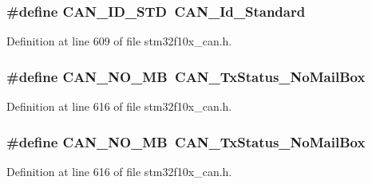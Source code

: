 \subsubsection[{\texorpdfstring{C\+A\+N\+\_\+\+I\+D\+\_\+\+S\+TD}{CAN_ID_STD}}]{\setlength{\rightskip}{0pt plus 5cm}\#define C\+A\+N\+\_\+\+I\+D\+\_\+\+S\+TD~{\bf C\+A\+N\+\_\+\+Id\+\_\+\+Standard}}\hypertarget{group___c_a_n___legacy_ga284ca16658deb9d0c21f4ddc6db14833}{}\label{group___c_a_n___legacy_ga284ca16658deb9d0c21f4ddc6db14833}


Definition at line 609 of file stm32f10x\+\_\+can.\+h.

\subsubsection[{\texorpdfstring{C\+A\+N\+\_\+\+N\+O\+\_\+\+MB}{CAN_NO_MB}}]{\setlength{\rightskip}{0pt plus 5cm}\#define C\+A\+N\+\_\+\+N\+O\+\_\+\+MB~{\bf C\+A\+N\+\_\+\+Tx\+Status\+\_\+\+No\+Mail\+Box}}\hypertarget{group___c_a_n___legacy_ga418f1fd7ca2e852b263fd07874fde0c6}{}\label{group___c_a_n___legacy_ga418f1fd7ca2e852b263fd07874fde0c6}


Definition at line 616 of file stm32f10x\+\_\+can.\+h.

\subsubsection[{\texorpdfstring{C\+A\+N\+\_\+\+N\+O\+\_\+\+MB}{CAN_NO_MB}}]{\setlength{\rightskip}{0pt plus 5cm}\#define C\+A\+N\+\_\+\+N\+O\+\_\+\+MB~{\bf C\+A\+N\+\_\+\+Tx\+Status\+\_\+\+No\+Mail\+Box}}\hypertarget{group___c_a_n___legacy_ga418f1fd7ca2e852b263fd07874fde0c6}{}\label{group___c_a_n___legacy_ga418f1fd7ca2e852b263fd07874fde0c6}


Definition at line 616 of file stm32f10x\+\_\+can.\+h.

